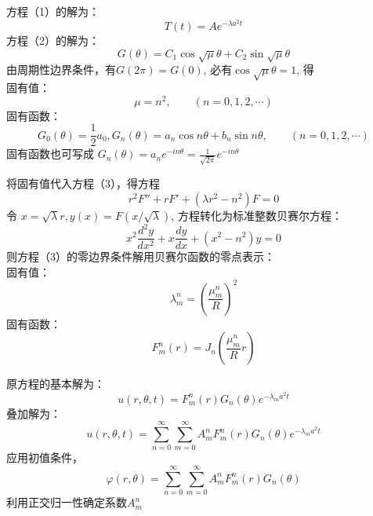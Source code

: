 \begin{frame}
	方程（1）的解为：\[T(t)=Ae^{-\lambda a^2 t}\]
	方程（2）的解为：\[G(\theta)=C_1\cos\sqrt{\mu}\theta + C_2\sin \sqrt{\mu}\theta \]
	由周期性边界条件，有$G(2\pi)=G(0)$, 必有$\cos \sqrt{\mu}\theta =1 $, 得\\
	固有值：
	\[\mu = n^2, \qquad (n=0,1,2,\cdots)\]
	固有函数：
	\[G_0(\theta)=\frac{1}{2}a_0, G_n(\theta)= a_n\cos n \theta + b_n \sin n \theta, \qquad (n=0,1,2,\cdots)\]
	固有函数也可写成 $ G_n(\theta)=a_n e^{-i n \theta} =\frac{1}{\sqrt{2\pi}} e^{-i n \theta}$
\end{frame}	

\begin{frame}
	将固有值代入方程（3），得方程 
	\[r^2 F''+r F' +(\lambda r^2 -n^2 )F=0 \]
	令 $x=\sqrt{\lambda} r, y(x)=F(x/\sqrt{\lambda})$, 
	方程转化为标准整数贝赛尔方程：
	\begin{equation*}
		x^2\frac{d^2y}{dx^2} + x\frac{dy}{dx} +(x^2 -n^2)y=0
	\end{equation*}
	则方程（3）的零边界条件解用贝赛尔函数的零点表示：\\
	固有值：
	\[\lambda_m ^n =(\frac{\mu_{m}^{n}}{R})^2 \]
	固有函数：\[F_m ^n(r) = J_n (\frac{\mu_{m}^{n}}{R}r) \]
\end{frame}	
\begin{frame}
	原方程的基本解为：
	\begin{equation*}
		u(r,\theta,t) =F_m ^n (r) G_n(\theta) e^{-\lambda_m a^2 t}
	\end{equation*}
	叠加解为：
	\begin{equation*}
		u(r,\theta,t) =\sum_{n=0}^{\infty} \sum_{m=0}^{\infty} A_m ^n F_m ^n (r) G_n(\theta) e^{-\lambda_m a^2 t}
	\end{equation*}
	应用初值条件， 
	\begin{equation*}
		\varphi(r, \theta)=\sum_{n=0}^{\infty} \sum_{m=0}^{\infty} A_m ^n F_m ^n (r) G_n(\theta) 
	\end{equation*}
	利用正交归一性确定系数$A_m ^n$
\end{frame}	

